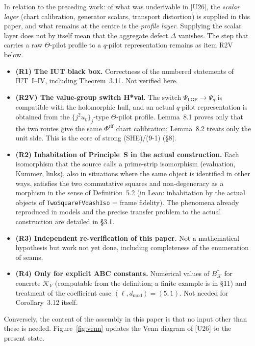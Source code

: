 \documentclass[11pt]{article}
\newcommand{\cK}{\mathcal K}
\begin{document}
In relation to the preceding work: of what was underivable in [U26],
the \emph{scalar layer} (chart calibration, generator scalars,
transport distortion) is supplied in this paper, and what remains at
the centre is the \emph{profile layer}.  Supplying the scalar layer
does not by itself mean that the aggregate defect $\Delta$ vanishes.
The step that carries a raw $\Theta$-pilot profile to a $q$-pilot
representation remains as item R2V below.

\begin{itemize}[leftmargin=*]
\item \textbf{(R1) The IUT black box.}  Correctness of the numbered
  statements of IUT~I--IV, including Theorem~3.11.  Not verified
  here.
\item \textbf{(R2V) The value-group switch H*val.}
  The switch $\Psi_{\mathrm{LGP}}\to\Psi_q$ is compatible with the
  holomorphic hull, and an actual $q$-pilot representation is
  obtained from the $\{j^2u_{\underline v}\}_j$-type $\Theta$-pilot
  profile.  Lemma~8.1 proves only that the two routes give the same
  $\Phi^{\mathrm{rlf}}$ chart calibration; Lemma~8.2 treats only the
  unit side.  This is the core of strong (SHE)/(9-1) (\S8).
\item \textbf{(R2) Inhabitation of Principle~S in the actual
  construction.}  Each isomorphism that the source calls a
  prime-strip isomorphism (evaluation, Kummer, links), also in
  situations where the same object is identified in other ways,
  satisfies the two commutative squares and non-degeneracy as a
  morphism in the sense of Definition~5.2 (in Lean: inhabitation by
  the actual objects of \texttt{TwoSquareFVdashIso} = frame
  fidelity).  The phenomena already reproduced in models and the
  precise transfer problem to the actual construction are detailed
  in \S3.1.
\item \textbf{(R3) Independent re-verification of this paper.}
  Not a mathematical hypothesis but work not yet done, including
  completeness of the enumeration of seams.
\item \textbf{(R4) Only for explicit ABC constants.}
  Numerical values of $B_{\cK}^{*}$ for concrete $\cK_V$ (computable
  from the definition; a finite example is in \S11) and treatment of
  the coefficient case $(\ell,d_{\mathrm{mod}})=(5,1)$.  Not needed
  for Corollary~3.12 itself.
\end{itemize}

Conversely, the content of the assembly in this paper is that no
input other than these is needed.  Figure~\ref{fig:venn} updates the
Venn diagram of [U26] to the present state.
\end{document}
